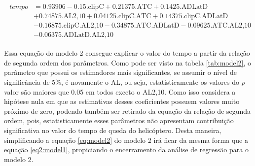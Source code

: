 \begin{align}
    \begin{split}
    tempo &= 0.93906 - 0.15\text{.clipC} + 0.21375\text{.ATC} + 0.1425\text{.ADLatD}  \\
    & + 0.74875\text{.AL2,10} + 0.04125\text{.clipC.ATC} + 0.14375\text{.clipC.ADLatD} \\
    & - 0.16875\text{.clipC.AL2,10} - 0.34875\text{.ATC.ADLatD} - 0.09625\text{.ATC.AL2,10} \\
    & - 0.06375\text{.ADLatD.AL2,10}
    \end{split}
\label{eq:model2}
\end{align}

Essa equação do modelo 2 consegue explicar o valor do tempo a partir da relação de segunda ordem dos parâmetros. Como pode ser visto na tabela \ref{tab:model2}, o parâmetro que possui os estimadores mais significantes, se assumir o nível de significância de 5\%, é novamente o AL, ou seja, estatisticamente os valores do $\rho$ valor são maiores que 0.05 em todos exceto o AL2,10. Como isso considera a hipótese nula em que as estimativas desses coeficientes possuem valores muito próximo de zero, podendo também ser retirado da equação da relação de segunda ordem, pois, estatisticamente esses parâmetros não apresentam contribuição significativa no valor do tempo de queda do helicóptero. Desta maneira, simplificando a equação \ref{eq:model2} do modelo 2 irá ficar da mesma forma que a equação \ref{eq2:model1}, propiciando o encerramento da análise de regressão para o modelo 2.
 
